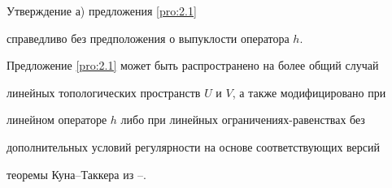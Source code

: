 \begin{note}


Утверждение а) предложения \ref{pro:2.1}


справедливо без предположения о выпуклости оператора $h$.


\end{note}





\begin{note}


Предложение \ref{pro:2.1} может быть распространено на более общий случай


линейных топологических пространств $U$ и $V$, а также модифицировано при 


линейном операторе $h$ либо при линейных ограничениях-равенствах без 


дополнительных условий регулярности на основе соответствующих версий 


теоремы Куна--Таккера из \cite{EGU62}--\cite{TK77}.


\end{note}






